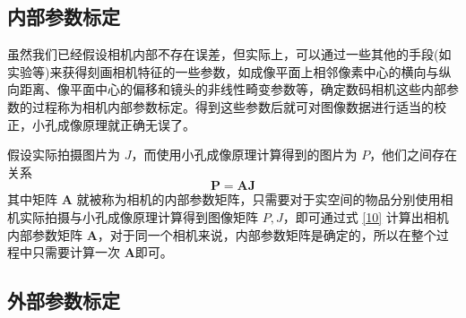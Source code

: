 \documentclass{article}
\numberwithin{equation}{section}						%
\numberwithin{figure}{section}							%
\begin{document}
\begin{sloppypar}
	\subsection{内部参数标定}
	虽然我们已经假设相机内部不存在误差，但实际上，可以通过一些其他的手段(如实验等)来获得刻画相机特征的一些参数，如成像平面上相邻像素中心的横向与纵向距离、像平面中心的偏移和镜头的非线性畸变参数等，确定数码相机这些内部参数的过程称为相机内部参数标定。得到这些参数后就可对图像数据进行适当的校正，小孔成像原理就正确无误了。
	
	假设实际拍摄图片为 $J$，而使用小孔成像原理计算得到的图片为 $P$，他们之间存在关系
	\begin{equation}
		{\bm P} = {\bm A}{\bm J}
		\label{eq10}
	\end{equation}
	其中矩阵 $\bm A$ 就被称为相机的内部参数矩阵，只需要对于实空间的物品分别使用相机实际拍摄与小孔成像原理计算得到图像矩阵 $P, J$，即可通过式 \ref{10} 计算出相机内部参数矩阵 ${\bm A}$，对于同一个相机来说，内部参数矩阵是确定的，所以在整个过程中只需要计算一次 ${\bm A}$即可。
	\subsection{外部参数标定}

\end{sloppypar}
\end{document}
